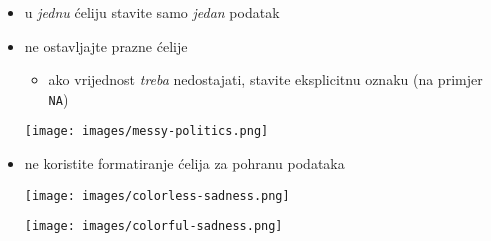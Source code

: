 \documentclass[aspectratio=169]{beamer}
\begin{document}
\begin{frame}
    \begin{itemize}
        \setlength{\itemsep}{2em}

        \item u \textit{jednu} ćeliju stavite samo \textit{jedan} podatak

        \item ne ostavljajte prazne ćelije

            \begin{itemize}
                \item ako vrijednost \textit{treba} nedostajati, stavite
                    eksplicitnu oznaku (na primjer \texttt{NA})

            \end{itemize}

        \vspace{1.5em}

        \texttt{[image: images/messy-politics.png]}
    \end{itemize}
\end{frame}

\begin{frame}
    \begin{itemize}
        \vspace*{1em}

        \item ne koristite formatiranje ćelija za pohranu podataka

        \pause

        \vspace{1em}

        \hspace{-.8em}%
        \texttt{[image: images/colorless-sadness.png]}

        \pause
        
        \texttt{[image: images/colorful-sadness.png]}

    \end{itemize}
\end{frame}
\end{document}
